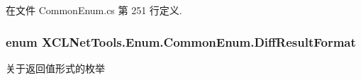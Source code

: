 在文件 Common\-Enum.\-cs 第 251 行定义.

\hypertarget{class_x_c_l_net_tools_1_1_enum_1_1_common_enum_aaefa466811a65c8971576fcdb80354a4}{
\subsubsection[{Diff\-Result\-Format}]{\setlength{\rightskip}{0pt plus 5cm}enum {\bf X\-C\-L\-Net\-Tools.\-Enum.\-Common\-Enum.\-Diff\-Result\-Format}}}\label{class_x_c_l_net_tools_1_1_enum_1_1_common_enum_aaefa466811a65c8971576fcdb80354a4}


关于返回值形式的枚举 

